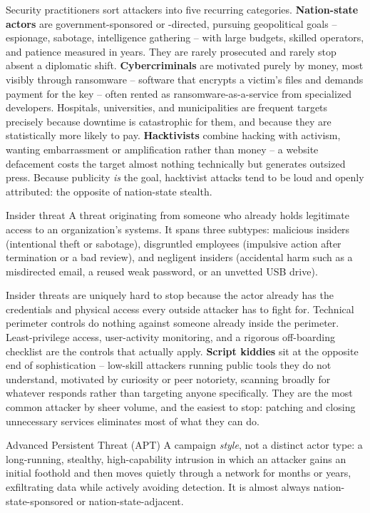 Security practitioners sort attackers into five recurring categories. \textbf{Nation-state actors}
are government-sponsored or -directed, pursuing geopolitical goals -- espionage, sabotage,
intelligence gathering -- with large budgets, skilled operators, and patience measured in years.
They are rarely prosecuted and rarely stop absent a diplomatic shift. \textbf{Cybercriminals} are
motivated purely by money, most visibly through ransomware -- software that encrypts a victim's
files and demands payment for the key -- often rented as ransomware-as-a-service from specialized
developers. Hospitals, universities, and municipalities are frequent targets precisely because
downtime is catastrophic for them, and because they are statistically more likely to pay.
\textbf{Hacktivists} combine hacking with activism, wanting embarrassment or amplification rather
than money -- a website defacement costs the target almost nothing technically but generates
outsized press. Because publicity \emph{is} the goal, hacktivist attacks tend to be loud and
openly attributed: the opposite of nation-state stealth.

\begin{definition}{Insider threat}
A threat originating from someone who already holds legitimate access to an organization's
systems. It spans three subtypes: malicious insiders (intentional theft or sabotage), disgruntled
employees (impulsive action after termination or a bad review), and negligent insiders (accidental
harm such as a misdirected email, a reused weak password, or an unvetted USB drive).
\end{definition}

Insider threats are uniquely hard to stop because the actor already has the credentials and
physical access every outside attacker has to fight for. Technical perimeter controls do nothing
against someone already inside the perimeter. Least-privilege access, user-activity monitoring,
and a rigorous off-boarding checklist are the controls that actually apply. \textbf{Script
kiddies} sit at the opposite end of sophistication -- low-skill attackers running public tools
they do not understand, motivated by curiosity or peer notoriety, scanning broadly for whatever
responds rather than targeting anyone specifically. They are the most common attacker by sheer
volume, and the easiest to stop: patching and closing unnecessary services eliminates most
of what they can do.

\begin{definition}{Advanced Persistent Threat (APT)}
A campaign \emph{style}, not a distinct actor type: a long-running, stealthy, high-capability
intrusion in which an attacker gains an initial foothold and then moves quietly through a network
for months or years, exfiltrating data while actively avoiding detection. It is almost always
nation-state-sponsored or nation-state-adjacent.
\end{definition}

